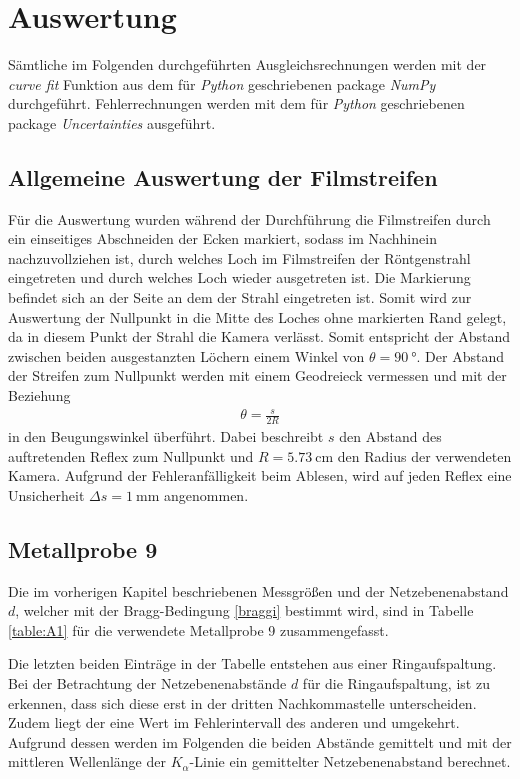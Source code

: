 \section{Auswertung}
\label{sec:Auswertung}
Sämtliche im Folgenden durchgeführten Ausgleichsrechnungen werden mit der \emph{curve fit} Funktion aus dem für \emph{Python} geschriebenen package \emph{NumPy}\cite{scipy} durchgeführt. Fehlerrechnungen werden mit dem für \emph{Python} geschriebenen package \emph{Uncertainties}\cite{uncertainties} ausgeführt.

\subsection{Allgemeine Auswertung der Filmstreifen}
\label{sec:allgemein}
Für die Auswertung wurden während der Durchführung die Filmstreifen durch ein einseitiges Abschneiden der Ecken markiert, sodass im Nachhinein nachzuvollziehen ist, durch welches Loch im Filmstreifen der Röntgenstrahl eingetreten und durch welches Loch wieder ausgetreten ist. Die Markierung befindet sich an der Seite an dem der Strahl eingetreten ist. Somit wird zur Auswertung der Nullpunkt in die Mitte des Loches ohne markierten Rand gelegt, da in diesem Punkt der Strahl die Kamera verlässt. Somit entspricht der Abstand zwischen beiden ausgestanzten Löchern einem Winkel von $\theta=\SI{90}{\degree}$. Der Abstand der Streifen zum Nullpunkt werden mit einem Geodreieck vermessen und mit der Beziehung
\begin{align}
	\theta=\frac{s}{2R}
\end{align}
in den Beugungswinkel überführt. Dabei beschreibt $s$ den Abstand des auftretenden Reflex zum Nullpunkt und $R=\SI{5.73}{\centi\meter}$ den Radius der verwendeten Kamera.  Aufgrund der Fehleranfälligkeit beim Ablesen, wird auf jeden Reflex eine Unsicherheit  $\Delta s=\SI{1}{\milli\meter}$ angenommen.

\subsection{Metallprobe 9}
\label{sec:Metallprobe9}
Die im vorherigen Kapitel beschriebenen Messgrößen und der Netzebenenabstand $d$, welcher mit der Bragg-Bedingung \eqref{braggi} bestimmt wird, sind in Tabelle \ref{table:A1} für die verwendete Metallprobe 9 zusammengefasst.

Die letzten beiden Einträge in der Tabelle entstehen aus einer Ringaufspaltung. Bei der Betrachtung der Netzebenenabstände $d$ für die Ringaufspaltung, ist zu erkennen, dass sich diese erst in der dritten Nachkommastelle unterscheiden. Zudem liegt der eine Wert im Fehlerintervall des anderen und umgekehrt. Aufgrund dessen werden im Folgenden die beiden Abstände gemittelt und mit der mittleren Wellenlänge der $K_\alpha$-Linie ein gemittelter Netzebenenabstand berechnet. \\

